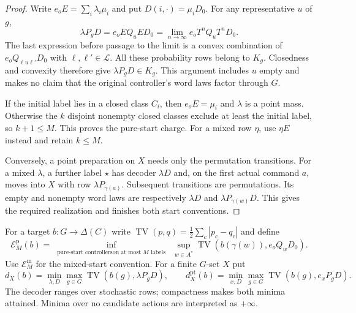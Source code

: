 \begin{proof}
Write $e_oE=\sum_i\lambda_i\mu_i$ and put $D(i,\cdot)=\mu_iD_0$.
For any representative $u$ of $g$,
\[
 \lambda P_gD=e_oEQ_uED_0
             =\lim_{n\to\infty}e_oT^nQ_uT^nD_0.
\]
The last expression before passage to the limit is a convex combination
of $e_oQ_{\ell u\ell'}D_0$ with $\ell,\ell'\in\mathcal L$.
All these probability rows belong to $K_g$. Closedness and convexity
therefore give $\lambda P_gD\in K_g$. This argument includes $u$
empty and makes no claim that the original controller's word laws
factor through $G$.

If the initial label lies in a closed class $C_i$, then $e_oE=\mu_i$
and $\lambda$ is a point mass. Otherwise the $k$ disjoint nonempty
closed classes exclude at least the initial label, so $k+1\le M$.
This proves the pure-start charge. For a mixed row $\eta$, use
$\eta E$ instead and retain $k\le M$.

Conversely, a point preparation on $X$ needs only the permutation
transitions. For a mixed $\lambda$, a further label $\star$ has decoder
$\lambda D$ and, on the first actual command $a$, moves into $X$ with
row $\lambda P_{\gamma(a)}$. Subsequent transitions are permutations.
Its empty and nonempty word laws are respectively $\lambda D$ and
$\lambda P_{\gamma(w)}D$. This gives the required realization and
finishes both start conventions.
\end{proof}

For a target $b:G\to\Delta(C)$ write
$\operatorname{TV}(p,q)=\tfrac12\sum_c|p_c-q_c|$ and define
\[
 \mathcal E_M^{\mathrm p}(b)=
 \inf_{\substack{\text{pure-start controllers}\text{on at most }M\text{ labels}}}
 \ \sup_{w\in A^*}\operatorname{TV}
           (b(\gamma(w)),e_oQ_wD_0).
\]
Use $\mathcal E_M^{\mathrm m}$ for the mixed-start convention.
For a finite $G$-set $X$ put
\[
 d_X(b)=\min_{\lambda,D}\max_{g\in G}
          \operatorname{TV}(b(g),\lambda P_gD),\qquad
 d_X^{\mathrm{pt}}(b)=\min_{x,D}\max_{g\in G}
          \operatorname{TV}(b(g),e_xP_gD).
\]
The decoder ranges over stochastic rows; compactness makes both minima
attained. Minima over no candidate actions are interpreted as $+\infty$.

